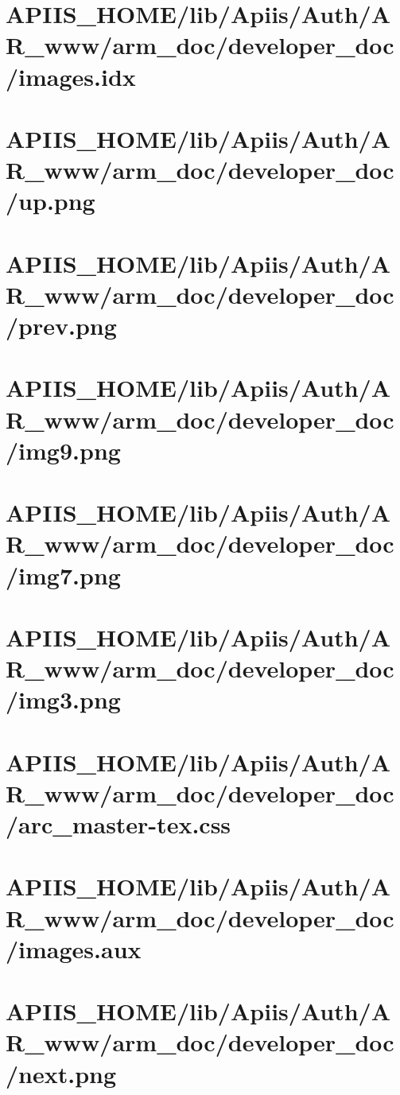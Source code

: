 \section{APIIS\_HOME/lib/Apiis/Auth/AR_www/arm_doc/developer_doc/images.idx} 
\section{APIIS\_HOME/lib/Apiis/Auth/AR_www/arm_doc/developer_doc/up.png} 
\section{APIIS\_HOME/lib/Apiis/Auth/AR_www/arm_doc/developer_doc/prev.png} 
\section{APIIS\_HOME/lib/Apiis/Auth/AR_www/arm_doc/developer_doc/img9.png} 
\section{APIIS\_HOME/lib/Apiis/Auth/AR_www/arm_doc/developer_doc/img7.png} 
\section{APIIS\_HOME/lib/Apiis/Auth/AR_www/arm_doc/developer_doc/img3.png} 
\section{APIIS\_HOME/lib/Apiis/Auth/AR_www/arm_doc/developer_doc/arc\_master-tex.css} 
\section{APIIS\_HOME/lib/Apiis/Auth/AR_www/arm_doc/developer_doc/images.aux} 
\section{APIIS\_HOME/lib/Apiis/Auth/AR_www/arm_doc/developer_doc/next.png} 
